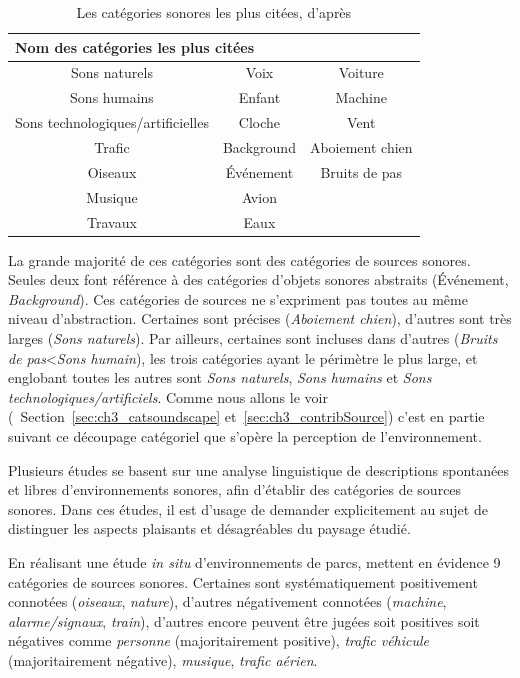 \begin{table}[t]
\centering
\begin{tabular}{ccc}    
\multicolumn{3}{l}{Nom des catégories les plus citées} \\             
\hline
Sons naturels                    & Voix       & Voiture\\
Sons humains                     & Enfant     & Machine\\
Sons technologiques/artificielles & Cloche     & Vent \\
Trafic                           & Background & Aboiement chien\\
Oiseaux                          & Événement  & Bruits de pas\\
Musique                          & Avion      & \\
Travaux                          & Eaux       & \\
\hline
\end{tabular}
\vspace{0.5mm}
\caption{Les catégories sonores les plus citées, d'après \citep{niessen2010categories}}
\label{tab:categoNiessen}
\end{table}

La grande majorité de ces catégories sont des catégories de sources sonores. Seules deux font référence à des catégories d'objets sonores abstraits (Événement, \emph{Background}). Ces catégories de sources ne s'expriment pas toutes au même niveau d'abstraction. Certaines sont précises (\emph{Aboiement chien}), d'autres sont très larges (\emph{Sons naturels}). Par ailleurs, certaines sont incluses dans d'autres (\emph{Bruits de pas}<\emph{Sons humain}), les trois catégories ayant le périmètre le plus large, et englobant toutes les autres sont  \emph{Sons naturels}, \emph{Sons humains} et \emph{Sons technologiques/artificiels}. Comme nous allons le voir (\cf~Section~\ref{sec:ch3_catsoundscape} et~\ref{sec:ch3_contribSource}) c'est en partie suivant ce découpage catégoriel que s'opère la perception de l'environnement.

Plusieurs études se basent sur une analyse linguistique de descriptions spontanées et libres d'environnements sonores, afin d'établir des catégories de sources sonores. Dans ces études, il est d'usage de demander explicitement au sujet de distinguer les aspects plaisants et désagréables du paysage étudié.

En réalisant une étude \emph{in situ} d'environnements de parcs, \citep{szeremeta2009analysis} mettent en évidence 9 catégories de sources sonores. Certaines sont systématiquement positivement connotées (\emph{oiseaux}, \emph{nature}), d'autres négativement connotées (\emph{machine}, \emph{alarme/signaux}, \emph{train}), d'autres encore peuvent être jugées soit positives soit négatives comme \emph{personne} (majoritairement positive), \emph{trafic véhicule} (majoritairement négative), \emph{musique}, \emph{trafic aérien}.

